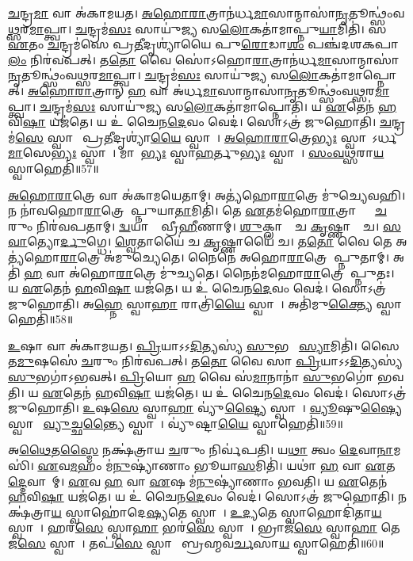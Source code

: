 \ul{𑌚}𑌨𑍍𑌦𑍍𑌰\ul{𑌮𑌾} 𑌵𑌾 𑌅॑𑌕𑌾𑌮𑌯𑌤।
\ul{𑌅}\ul{𑌹𑍋}\ul{𑌰𑌾}𑌤𑍍𑌰𑌾𑌨॑𑌰𑍍𑌧\ul{𑌮𑌾}𑌸𑌾𑌨𑍍𑌮𑌾𑌸𑌾॑\ul{𑌨𑍃}𑌤𑍂𑌨𑍍𑌥𑍍𑌸𑌂॑\-𑌵\ul{𑌥𑍍𑌸}𑌰\ul{𑌮𑌾}𑌪𑍍𑌤𑍍𑌵𑌾।
\ul{𑌚}𑌨𑍍𑌦𑍍𑌰𑌮॑\ul{𑌸𑌃} 𑌸𑌾𑌯𑍁॑𑌜𑍍𑌯 𑌸\ul{𑌲𑍋}𑌕𑌤𑌾॑𑌮𑌾𑌪𑍍𑌨𑍁\ul{𑌯𑌾}𑌮𑌿𑌤𑌿॑।
𑌸 \ul{𑌏}𑌤𑌂 \ul{𑌚}𑌨𑍍𑌦𑍍𑌰𑌮॑𑌸𑍇 𑌪𑍍𑌰\ul{𑌤𑍀}𑌦𑍃𑌶𑍍𑌯𑌾॑𑌯𑍈 𑌪𑍁\ul{𑌰𑍋}𑌡𑌾\ul{𑌶𑌂} 𑌪𑌞𑍍𑌚॑𑌦𑌶𑌕𑌪𑌾\ul{𑌲𑌂} 𑌨𑌿𑌰॑𑌵𑌪𑌤𑍍।
𑌤\ul{𑌤𑍋} 𑌵𑍈 𑌸𑍋॑\-𑌽𑌹𑍋\ul{𑌰𑌾}𑌤𑍍𑌰𑌾𑌨॑𑌰𑍍𑌧\ul{𑌮𑌾}𑌸𑌾𑌨𑍍𑌮𑌾𑌸𑌾॑\ul{𑌨𑍃}𑌤𑍂𑌨𑍍𑌥𑍍𑌸𑌂॑𑌵\ul{𑌥𑍍𑌸}𑌰\-\ul{𑌮𑌾}𑌪𑍍𑌤𑍍𑌵𑌾।
\ul{𑌚}𑌨𑍍𑌦𑍍𑌰𑌮॑\ul{𑌸𑌃} 𑌸𑌾𑌯𑍁॑𑌜𑍍𑌯 𑌸\ul{𑌲𑍋}𑌕𑌤𑌾॑𑌮𑌾𑌪𑍍𑌨𑍋𑌤𑍍।
\ul{𑌅}\ul{𑌹𑍋}\ul{𑌰𑌾}𑌤𑍍𑌰𑌾𑌨𑍍 \ul{𑌹} 𑌵𑌾 𑌅॑𑌰𑍍𑌧\ul{𑌮𑌾}𑌸𑌾𑌨𑍍𑌮𑌾𑌸𑌾॑\ul{𑌨𑍃}𑌤𑍂𑌨𑍍𑌥𑍍𑌸𑌂॑𑌵\ul{𑌥𑍍𑌸}𑌰\ul{𑌮𑌾}𑌪𑍍𑌤𑍍𑌵𑌾।
\ul{𑌚}𑌨𑍍𑌦𑍍𑌰𑌮॑\ul{𑌸𑌃} 𑌸𑌾𑌯𑍁॑𑌜𑍍𑌯 𑌸\ul{𑌲𑍋}𑌕𑌤𑌾॑𑌮𑌾𑌪𑍍𑌨𑍋𑌤𑌿।
𑌯 \ul{𑌏}𑌤𑍇𑌨॑ \ul{𑌹}𑌵𑌿\ul{𑌷𑌾} 𑌯𑌜॑𑌤𑍇।
𑌯 𑌉॑ 𑌚𑍈𑌨\ul{𑌦𑍇}𑌵𑌂 𑌵𑍇𑌦॑।
𑌸𑍋𑌽𑌤𑍍𑌰॑ 𑌜𑍁𑌹𑍋𑌤𑌿।
\ul{𑌚}𑌨𑍍𑌦𑍍𑌰𑌮॑\ul{𑌸𑍇} 𑌸𑍍𑌵𑌾𑌹𑌾᳚ 𑌪𑍍𑌰\ul{𑌤𑍀}𑌦𑍃𑌶𑍍𑌯𑌾॑\ul{𑌯𑍈} 𑌸𑍍𑌵𑌾𑌹𑌾᳚।
\ul{𑌅}\ul{𑌹𑍋}\ul{𑌰𑌾}𑌤𑍍𑌰𑍇\ul{𑌭𑍍𑌯𑌃} 𑌸𑍍𑌵𑌾𑌹𑌾᳚\-𑌽𑌰𑍍𑌧\ul{𑌮𑌾}𑌸𑍇\ul{𑌭𑍍𑌯𑌃} 𑌸𑍍𑌵𑌾𑌹𑌾᳚।
𑌮𑌾𑌸𑍇᳚\ul{𑌭𑍍𑌯𑌃} 𑌸𑍍𑌵𑌾\ul{𑌹}𑌰𑍍𑌤𑍁\ul{𑌭𑍍𑌯𑌃} 𑌸𑍍𑌵𑌾𑌹𑌾᳚।
\ul{𑌸𑌂}\ul{𑌵}\ul{𑌥𑍍𑌸}𑌰𑌾\ul{𑌯} 𑌸𑍍𑌵𑌾𑌹𑍇𑌤𑌿॑॥57॥

\ul{𑌅}\ul{𑌹𑍋}\ul{𑌰𑌾}𑌤𑍍𑌰𑍇 𑌵𑌾 𑌅॑𑌕𑌾𑌮𑌯𑍇𑌤𑌾𑌮𑍍।
𑌅𑌤𑍍𑌯॑𑌹𑍋\ul{𑌰𑌾}𑌤𑍍𑌰𑍇 𑌮𑍁॑𑌚𑍍𑌯𑍇𑌵𑌹𑌿।
𑌨 𑌨𑌾॑𑌵𑌹𑍋\ul{𑌰𑌾}𑌤𑍍𑌰𑍇 𑌆᳚𑌪𑍍𑌨𑍁𑌯𑌾\ul{𑌤𑌾}𑌮𑌿𑌤𑌿॑।
𑌤𑍇 \ul{𑌏}𑌤𑌮॑𑌹𑍋\ul{𑌰𑌾}𑌤𑍍𑌰𑌾𑌭𑍍𑌯𑌾𑌂᳚ \ul{𑌚}𑌰𑍁𑌂 𑌨𑌿𑌰॑𑌵𑌪𑌤𑌾𑌮𑍍।
\ul{𑌦𑍍𑌵}𑌯𑌾𑌨𑌾𑌂᳚ 𑌵𑍍𑌰𑍀\ul{𑌹𑍀}𑌣𑌾𑌮𑍍।
\ul{𑌶𑍁}𑌕𑍍𑌲𑌾𑌨𑌾𑌂᳚ 𑌚 \ul{𑌕𑍃}𑌷𑍍𑌣𑌾𑌨𑌾𑌂᳚ 𑌚।
\ul{𑌸}\ul{𑌵𑌾}𑌤𑍍𑌯𑍋\ul{𑌰𑍍𑌦𑍁}𑌗𑍍𑌧𑍇।
\ul{𑌶𑍍𑌵𑍇}𑌤𑌾𑌯𑍈॑ 𑌚 \ul{𑌕𑍃}𑌷𑍍𑌣𑌾𑌯𑍈॑ 𑌚।
𑌤\ul{𑌤𑍋} 𑌵𑍈 𑌤𑍇 𑌅𑌤𑍍𑌯॑𑌹𑍋\ul{𑌰𑌾}𑌤𑍍𑌰𑍇 𑌅॑𑌮𑍁𑌚𑍍𑌯𑍇𑌤𑍇।
𑌨𑍈𑌨𑍇॑ 𑌅𑌹𑍋\ul{𑌰𑌾}𑌤𑍍𑌰𑍇 𑌆᳚𑌪𑍍𑌨𑍁𑌤𑌾𑌮𑍍।
𑌅𑌤𑌿॑ \ul{𑌹} 𑌵𑌾 𑌅॑𑌹𑍋\ul{𑌰𑌾}𑌤𑍍𑌰𑍇 𑌮𑍁॑𑌚𑍍𑌯𑌤𑍇।
𑌨𑍈𑌨॑𑌮𑌹𑍋\ul{𑌰𑌾}𑌤𑍍𑌰𑍇 𑌆᳚𑌪𑍍𑌨𑍁𑌤𑌃।
𑌯 \ul{𑌏}𑌤𑍇𑌨॑ \ul{𑌹}𑌵𑌿\ul{𑌷𑌾} 𑌯𑌜॑𑌤𑍇।
𑌯 𑌉॑ 𑌚𑍈𑌨\ul{𑌦𑍇}𑌵𑌂 𑌵𑍇𑌦॑।
𑌸𑍋𑌽𑌤𑍍𑌰॑ 𑌜𑍁𑌹𑍋𑌤𑌿।
𑌅\ul{𑌹𑍍𑌨𑍇} 𑌸𑍍𑌵𑌾\ul{𑌹𑌾} 𑌰𑌾𑌤𑍍𑌰𑌿॑\ul{𑌯𑍈} 𑌸𑍍𑌵𑌾𑌹𑌾᳚।
𑌅𑌤𑌿॑𑌮𑍁\ul{𑌕𑍍𑌤𑍍𑌯𑍈} 𑌸𑍍𑌵𑌾𑌹𑍇𑌤𑌿॑॥58॥

\ul{𑌉}𑌷𑌾 𑌵𑌾 𑌅॑𑌕𑌾𑌮𑌯𑌤।
\ul{𑌪𑍍𑌰𑌿}𑌯𑌾\-𑌽𑌽\ul{𑌦𑌿}𑌤𑍍𑌯𑌸𑍍𑌯॑ \ul{𑌸𑍁}𑌭𑌗𑌾᳚ \ul{𑌸𑍍𑌯𑌾}𑌮𑌿𑌤𑌿॑।
𑌸𑍈𑌤\ul{𑌮𑍁}𑌷𑌸𑍇॑ \ul{𑌚}𑌰𑍁𑌂 𑌨𑌿𑌰॑𑌵𑌪𑌤𑍍।
𑌤\ul{𑌤𑍋} 𑌵𑍈 𑌸𑌾 \ul{𑌪𑍍𑌰𑌿}𑌯𑌾\-𑌽𑌽\ul{𑌦𑌿}𑌤𑍍𑌯𑌸𑍍𑌯॑ \ul{𑌸𑍁}𑌭𑌗𑌾॑\-𑌽𑌭𑌵𑌤𑍍।
\ul{𑌪𑍍𑌰𑌿}𑌯𑍋 \ul{𑌹} 𑌵𑍈 𑌸॑\ul{𑌮𑌾}𑌨𑌾𑌨𑌾॑ \ul{𑌸𑍁}𑌭𑌗𑍋॑ 𑌭𑌵𑌤𑌿।
𑌯 \ul{𑌏}𑌤𑍇𑌨॑ \ul{𑌹}𑌵𑌿\ul{𑌷𑌾} 𑌯𑌜॑𑌤𑍇।
𑌯 𑌉॑ 𑌚𑍈𑌨\ul{𑌦𑍇}𑌵𑌂 𑌵𑍇𑌦॑।
𑌸𑍋𑌽𑌤𑍍𑌰॑ 𑌜𑍁𑌹𑍋𑌤𑌿।
\ul{𑌉}𑌷\ul{𑌸𑍇} 𑌸𑍍𑌵𑌾\ul{𑌹𑌾} 𑌵𑍍𑌯𑍁॑\ul{𑌷𑍍𑌟𑍍𑌯𑍈} 𑌸𑍍𑌵𑌾𑌹𑌾᳚।
\ul{𑌵𑍍𑌯𑍂}𑌷𑍁\ul{𑌷𑍍𑌯𑍈} 𑌸𑍍𑌵𑌾𑌹𑌾᳚ \ul{𑌵𑍍𑌯𑍁}𑌚𑍍𑌛\ul{𑌨𑍍𑌤𑍍𑌯𑍈} 𑌸𑍍𑌵𑌾𑌹𑌾᳚।
𑌵𑍍𑌯𑍁॑𑌷𑍍𑌟𑌾\ul{𑌯𑍈} 𑌸𑍍𑌵𑌾𑌹𑍇𑌤𑌿॑॥59॥

𑌅\ul{𑌥𑍈}𑌤\ul{𑌸𑍍𑌮𑍈} 𑌨𑌕𑍍𑌷॑𑌤𑍍𑌰𑌾𑌯 \ul{𑌚}𑌰𑍁𑌂 𑌨𑌿𑌰𑍍𑌵॑𑌪𑌤𑌿।
𑌯\ul{𑌥𑌾} 𑌤𑍍𑌵𑌂 \ul{𑌦𑍇}𑌵𑌾\ul{𑌨𑌾}𑌮𑌸𑌿॑।
\ul{𑌏}𑌵\ul{𑌮}𑌹𑌂 𑌮॑\ul{𑌨𑍁}𑌷𑍍𑌯𑌾॑𑌣𑌾𑌂 𑌭𑍂𑌯𑌾\ul{𑌸}𑌮𑌿𑌤𑌿॑।
𑌯𑌥𑌾॑ \ul{𑌹} 𑌵𑌾 \ul{𑌏}𑌤\ul{𑌦𑍍𑌦𑍇}𑌵𑌾𑌨𑌾᳚𑌮𑍍।
\ul{𑌏}𑌵 \ul{𑌹} 𑌵𑌾 \ul{𑌏}𑌷 𑌮॑\ul{𑌨𑍁}𑌷𑍍𑌯𑌾॑𑌣𑌾𑌂 𑌭𑌵𑌤𑌿।
𑌯 \ul{𑌏}𑌤𑍇𑌨॑ \ul{𑌹}𑌵𑌿\ul{𑌷𑌾} 𑌯𑌜॑𑌤𑍇।
𑌯 𑌉॑ 𑌚𑍈𑌨\ul{𑌦𑍇}𑌵𑌂 𑌵𑍇𑌦॑।
𑌸𑍋𑌽𑌤𑍍𑌰॑ 𑌜𑍁𑌹𑍋𑌤𑌿।
𑌨𑌕𑍍𑌷॑𑌤𑍍𑌰𑌾\ul{𑌯} 𑌸𑍍𑌵𑌾𑌹𑍋॑𑌦𑍇\ul{𑌷𑍍𑌯}𑌤𑍇 𑌸𑍍𑌵𑌾𑌹𑌾᳚।
\ul{𑌉}\ul{𑌦𑍍𑌯}𑌤𑍇 𑌸𑍍𑌵𑌾𑌹𑍋𑌦𑌿॑𑌤𑌾\ul{𑌯} 𑌸𑍍𑌵𑌾𑌹𑌾᳚।
𑌹𑌰॑\ul{𑌸𑍇} 𑌸𑍍𑌵𑌾\ul{𑌹𑌾} 𑌭𑌰॑\ul{𑌸𑍇} 𑌸𑍍𑌵𑌾𑌹𑌾᳚।
𑌭𑍍𑌰𑌾𑌜॑\ul{𑌸𑍇} 𑌸𑍍𑌵𑌾\ul{𑌹𑌾} 𑌤𑍇𑌜॑\ul{𑌸𑍇} 𑌸𑍍𑌵𑌾𑌹𑌾᳚।
𑌤𑌪॑\ul{𑌸𑍇} 𑌸𑍍𑌵𑌾𑌹𑌾᳚ 𑌬𑍍𑌰𑌹𑍍𑌮𑌵\ul{𑌰𑍍𑌚}𑌸𑌾\ul{𑌯} 𑌸𑍍𑌵𑌾𑌹𑍇𑌤𑌿॑॥60॥

